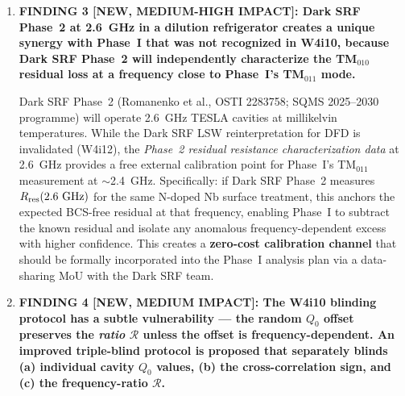\documentclass[11pt]{article}
\theoremstyle{definition}
\theoremstyle{remark}
\begin{document}
\begin{tcolorbox}[colback=blue!5!white, colframe=blue!60!black,
  title=\textbf{W4i13 TOP 5 FINDINGS --- Ranked by Programme Impact}]
\begin{enumerate}
Dhakal et al.\ (Phys.\ Rev.\ Accel.\ Beams 27, 062001, 2024)
demonstrated that nitrogen-diffused Nb cavities exhibit a $Q$-rise
effect (decreasing surface resistance with increasing RF field) that
is \emph{stronger at higher frequencies} and \emph{stronger at
lower temperatures}. At 20~mK and 2.4~GHz (TM$_{011}$), the NEQ
effect could produce a $\delta Q_0^{-1}$ that is \emph{smaller}
at 2.4~GHz than at 1.3~GHz --- i.e., a Q-ratio $\mathcal{R} < 1$.
This has the same qualitative direction as the DFD psi-channel
($\mathcal{R} = 0.49$). The mitigation is the field-amplitude scan:
the NEQ effect has a characteristic $E_{\rm acc}$-dependence
(onset above a threshold), while DFD psi-loss is linear in $u_{\rm EM}
\propto E_{\rm acc}^2$. Multi-gradient measurements (2, 5, 10, 16~MV/m)
at each frequency decompose the two contributions. This analysis
is \textbf{missing from the W4i10 proposal} and must be added.

\item \textbf{FINDING 3 [NEW, MEDIUM-HIGH IMPACT]: Dark SRF Phase~2 at
2.6~GHz in a dilution refrigerator creates a unique synergy with Phase~I
that was not recognized in W4i10, because Dark SRF Phase~2 will independently
characterize the TM$_{010}$ residual loss at a frequency close to Phase~I's
TM$_{011}$ mode.}

Dark SRF Phase~2 (Romanenko et al., OSTI 2283758; SQMS 2025--2030 programme)
will operate 2.6~GHz TESLA cavities at millikelvin temperatures. While
the Dark SRF LSW reinterpretation for DFD is invalidated (W4i12), the
\emph{Phase~2 residual resistance characterization data} at 2.6~GHz
provides a free external calibration point for Phase~I's TM$_{011}$
measurement at $\sim$2.4~GHz. Specifically: if Dark SRF Phase~2 measures
$R_{\rm res}(2.6~\text{GHz})$ for the same N-doped Nb surface treatment,
this anchors the expected BCS-free residual at that frequency, enabling
Phase~I to subtract the known residual and isolate any anomalous
frequency-dependent excess with higher confidence. This creates a
\textbf{zero-cost calibration channel} that should be formally incorporated
into the Phase~I analysis plan via a data-sharing MoU with the
Dark SRF team.

\item \textbf{FINDING 4 [NEW, MEDIUM IMPACT]: The W4i10 blinding protocol
has a subtle vulnerability --- the random $Q_0$ offset preserves the
\emph{ratio} $\mathcal{R}$ unless the offset is frequency-dependent.
An improved triple-blind protocol is proposed that separately blinds
(a) individual cavity $Q_0$ values, (b) the cross-correlation sign,
and (c) the frequency-ratio $\mathcal{R}$.}


\end{enumerate}
\end{tcolorbox}
\end{document}
